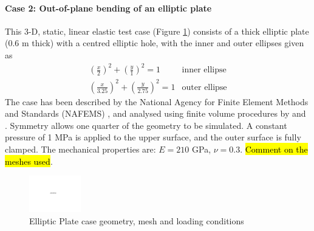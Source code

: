 \documentclass[sn-mathphys,Numbered]{sn-jnl}%
\begin{document}
\paragraph{Case 2: Out-of-plane bending of an elliptic plate}
This 3-D, static, linear elastic test case (Figure \ref{fig:elliptic_plate}) consists of a thick elliptic plate (0.6 m thick) with a centred elliptic hole, with the inner and outer ellipses given as
\begin{eqnarray}
	\left(\frac{x}{2}\right)^2 + \left(\frac{y}{1}\right)^2 = 1 & \text{inner ellipse} \\
	\left(\frac{x}{3.25}\right)^2 + \left(\frac{y}{2.75}\right)^2 = 1 & \text{outer ellipse}
\end{eqnarray}
The case has been described by the National Agency for Finite Element Methods and Standards (NAFEMS) \cite{NAFEMS}, and analysed using finite volume procedures by \citet{Demirdzic1997} and \citet{Cardiff2016}.
Symmetry allows one quarter of the geometry to be simulated.
A constant pressure of 1 MPa is applied to the upper surface, and the outer surface is fully clamped.
The mechanical properties are: $E = 210$ GPa, $\nu = 0.3$.
\hl{Comment on the meshes used}.
\begin{figure}[htbp]
   \centering
   \includegraphics[width=0.2\textwidth]{figures/placeholder.pdf} 
   \caption{Elliptic Plate case geometry, mesh and loading conditions}
   \label{fig:elliptic_plate}
\end{figure}
\end{document}
